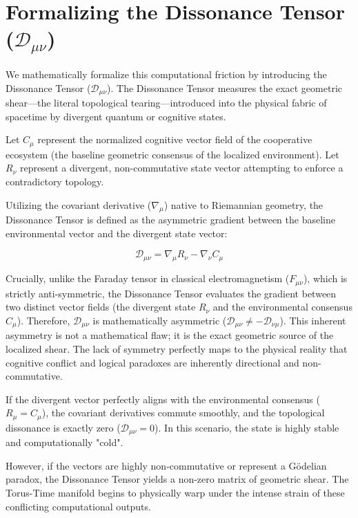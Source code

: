 \documentclass[12pt,openany]{book}
\theoremstyle{plain}
\theoremstyle{definition}
\theoremstyle{remark}
\begin{document}
\section{Formalizing the Dissonance Tensor ($\mathcal{D}_{\mu\nu}$)}

We mathematically formalize this computational friction by introducing the Dissonance Tensor ($\mathcal{D}_{\mu\nu}$). The Dissonance Tensor measures the exact geometric shear—the literal topological tearing—introduced into the physical fabric of spacetime by divergent quantum or cognitive states.

Let $C_\mu$ represent the normalized cognitive vector field of the cooperative ecosystem (the baseline geometric consensus of the localized environment). Let $R_\nu$ represent a divergent, non-commutative state vector attempting to enforce a contradictory topology. 

Utilizing the covariant derivative ($\nabla_\mu$) native to Riemannian geometry, the Dissonance Tensor is defined as the asymmetric gradient between the baseline environmental vector and the divergent state vector:

\begin{equation}
\mathcal{D}_{\mu\nu} = \nabla_\mu R_\nu - \nabla_\nu C_\mu
\end{equation}

Crucially, unlike the Faraday tensor in classical electromagnetism ($F_{\mu\nu}$), which is strictly anti-symmetric, the Dissonance Tensor evaluates the gradient between two distinct vector fields (the divergent state $R_\nu$ and the environmental consensus $C_\mu$). Therefore, $\mathcal{D}_{\mu\nu}$ is mathematically asymmetric ($\mathcal{D}_{\mu\nu} \neq -\mathcal{D}_{\nu\mu}$). This inherent asymmetry is not a mathematical flaw; it is the exact geometric source of the localized shear. The lack of symmetry perfectly maps to the physical reality that cognitive conflict and logical paradoxes are inherently directional and non-commutative.

If the divergent vector perfectly aligns with the environmental consensus ($R_\mu = C_\mu$), the covariant derivatives commute smoothly, and the topological dissonance is exactly zero ($\mathcal{D}_{\mu\nu} = 0$). In this scenario, the state is highly stable and computationally "cold".

However, if the vectors are highly non-commutative or represent a Gödelian paradox, the Dissonance Tensor yields a non-zero matrix of geometric shear. The Torus-Time manifold begins to physically warp under the intense strain of these conflicting computational outputs. 
\end{document}
